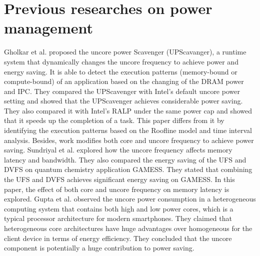 \section{Previous researches on power management}
Gholkar et al. \cite{21} proposed the uncore power Scavenger (UPScavanger), a runtime system that dynamically changes the uncore frequency to achieve power and energy saving. It is able to detect the execution patterns (memory-bound or compute-bound) of an application based on the changing of the DRAM power and IPC. They compared the UPScavenger with Intel's default uncore power setting and showed that the UPScavenger achieves considerable power saving. They also compared it with Intel's RALP under the same power cap and showed that it speeds up the completion of a task. This paper differs from it by identifying the execution patterns based on the Roofline model and time interval analysis. Besides, work modifies both core and uncore frequency to achieve power saving.
Sundriyal et al. \cite{34} explored how the uncore frequency affects memory latency and bandwidth. They also compared the energy saving of the UFS and DVFS on quantum chemistry application GAMESS. They stated that combining the UFS and DVFS achieves significant energy saving on GAMESS. In this paper, the effect of both core and uncore frequency on memory latency is explored.
Gupta et al. \cite{37} observed the uncore power consumption in a heterogeneous computing system that contains both high and low power cores, which is a typical processor architecture for modern smartphones. They claimed that heterogeneous core architectures have huge advantages over homogeneous for the client device in terms of energy efficiency. They concluded that the uncore component is potentially a huge contribution to power saving.


